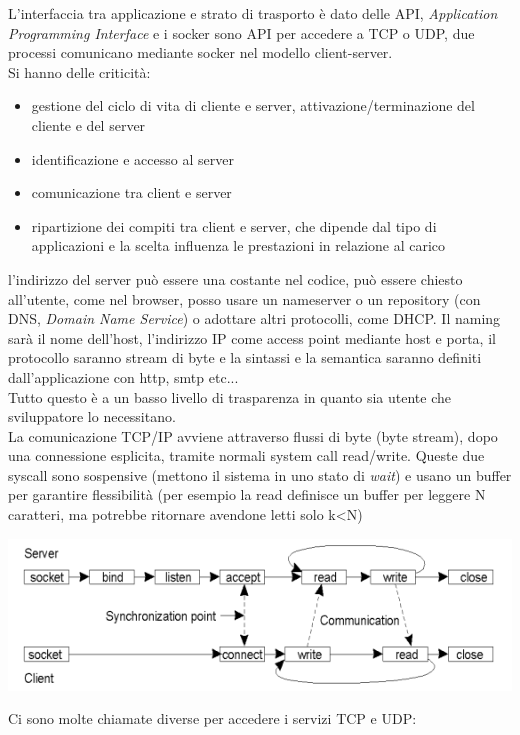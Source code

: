 \documentclass[a4paper,12pt, oneside]{book}
\begin{document}
L'interfaccia tra applicazione e strato di trasporto è dato delle API, \textit{Application Programming Interface}  e i socker sono API per accedere a TCP o UDP, due processi comunicano mediante socker nel modello client-server.\\
Si hanno delle criticità:
\begin{itemize}
\item gestione del ciclo di vita di cliente e server, attivazione/terminazione del cliente e del server
\item identificazione e accesso al server
\item comunicazione tra client e server
\item ripartizione dei compiti tra client e server, che dipende dal tipo di applicazioni e la scelta influenza le prestazioni in relazione al carico
\end{itemize}
l'indirizzo del server può essere una costante nel codice, può essere chiesto all'utente, come nel browser, posso usare un nameserver o un repository (con DNS, \textit{Domain Name Service}) o adottare altri protocolli, come DHCP. Il naming sarà il nome dell'host, l'indirizzo IP come access point mediante host e porta, il protocollo saranno stream di byte e la sintassi e la semantica saranno definiti dall'applicazione con http, smtp etc...\\
Tutto questo è a un basso livello di trasparenza in quanto sia utente che sviluppatore lo necessitano.\\
La comunicazione TCP/IP avviene attraverso flussi di byte
(byte stream), dopo una connessione esplicita, tramite
normali system call read/write. Queste due syscall sono sospensive (mettono il sistema in uno stato di \textit{wait}) e usano un buffer per garantire flessibilità (per esempio la read definisce un buffer per leggere N caratteri, ma potrebbe ritornare avendone letti solo k<N)
\begin{center}
\includegraphics[scale=0.7]{img/sc2.png}
\end{center}
\newpage
Ci sono molte chiamate diverse per accedere i servizi TCP e UDP:
\end{document}
